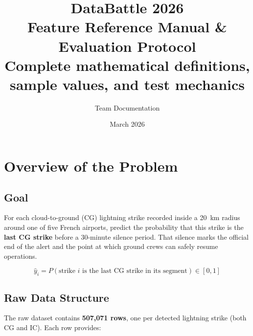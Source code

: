 \documentclass[12pt,a4paper]{article}
\title{
  \vspace{-1cm}
  {\Large \textbf{DataBattle 2026}}\\[0.4em]
  {\large Feature Reference Manual \& Evaluation Protocol}\\[0.3em]
  {\normalsize Complete mathematical definitions, sample values, and test mechanics}
}
\author{Team Documentation}
\date{March 2026}
\begin{document}
\maketitle
\thispagestyle{fancy}
\tableofcontents
\newpage

\section{Overview of the Problem}

\subsection{Goal}

For each cloud-to-ground (CG) lightning strike recorded inside a 20~km radius around one of five French airports, predict the probability that this strike is the \textbf{last CG strike} before a 30-minute silence period. That silence marks the official end of the alert and the point at which ground crews can safely resume operations.

\[
  \hat{y}_i = P\!\left(\text{strike } i \text{ is the last CG strike in its segment}\right) \in [0, 1]
\]

\subsection{Raw Data Structure}

The raw dataset contains \textbf{507,071 rows}, one per detected lightning strike (both CG and IC). Each row provides:
\end{document}
